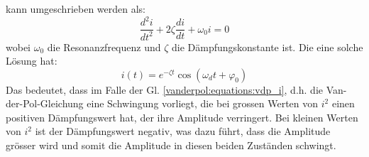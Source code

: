 kann umgeschrieben werden als:
\begin{equation}
\frac{d^{2}i}{d t^{2}}+ 2\zeta \frac{d i}{d t}+\omega_0i = 0
\end{equation}
wobei $\omega_0$ die Resonanzfrequenz und $\zeta$ die Dämpfungskonstante ist. Die eine solche Lösung hat:
\begin{equation}
i(t) = e^{-\zeta t} \cos(\omega_dt+\varphi_0)
\end{equation}
Das bedeutet, dass im Falle der Gl. \ref{vanderpol:equations:vdp_i}, d.h. die Van-der-Pol-Gleichung eine Schwingung vorliegt, die bei grossen Werten von $i^2$ einen positiven Dämpfungswert hat, der ihre Amplitude verringert. Bei kleinen Werten von $i^2$ ist der Dämpfungswert negativ, was dazu führt, dass die Amplitude grösser wird und somit die Amplitude in diesen beiden Zuständen schwingt.

